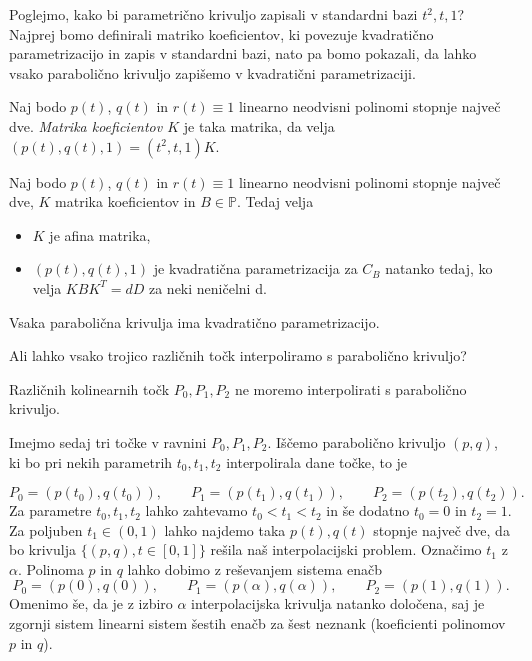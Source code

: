 \documentclass[mat1]{fmfdelo}
\newcommand{\PP}{\mathbb P}
\newcommand{\al}{\alpha}
\begin{document}
Poglejmo, kako bi parametrično krivuljo zapisali v standardni bazi $t^2, t, 1$? Najprej bomo definirali matriko koeficientov, ki povezuje kvadratično parametrizacijo in zapis v standardni bazi, nato pa bomo pokazali, da lahko vsako parabolično krivuljo zapišemo v kvadratični parametrizaciji.

\begin{definicija}
Naj bodo $p(t)$, $q(t)$ in $r(t) \equiv 1$ linearno neodvisni polinomi stopnje največ dve. \emph{Matrika koeficientov $K$} je taka matrika, da velja $ (p(t), q(t), 1) = (t^2,t,1) K$.
\end{definicija} 

\begin{trditev}
Naj bodo $p(t)$, $q(t)$ in $r(t) \equiv 1$ linearno neodvisni polinomi stopnje največ dve, $K$ matrika koeficientov in $B \in \PP$. Tedaj velja
\begin{itemize}
\item $K$ je afina matrika,
\item  $ ( p(t), q(t), 1)$ je kvadratična parametrizacija za $C_B$ natanko tedaj, ko velja $K B K^T = d D$ za neki neničelni d.
\end{itemize}
\end{trditev}


\begin{posledica}
Vsaka parabolična krivulja ima kvadratično parametrizacijo.
\end{posledica}

Ali lahko vsako trojico različnih točk interpoliramo s parabolično krivuljo? 

\begin{trditev}
Različnih kolinearnih točk $P_0, P_1, P_2$ ne moremo interpolirati s parabolično krivuljo.
\end{trditev}

Imejmo sedaj tri točke v ravnini $P_0, P_1, P_2$. Iščemo parabolično krivuljo $(p, q)$, ki bo pri nekih parametrih $t_0, t_1, t_2$ interpolirala dane točke, to je %

$$ P_0 = (p(t_0), q(t_0)), \qquad P_1 = (p(t_1), q(t_1)), \qquad P_2 = (p(t_2), q(t_2)).$$
Za parametre $t_0, t_1, t_2$ lahko zahtevamo $t_0 < t_1 < t_2$ in še dodatno $t_0 = 0$ in $t_2 = 1$. Za poljuben $t_1 \in (0,1)$  lahko najdemo taka $p(t), q(t)$ stopnje največ dve, da bo krivulja $ \{(p, q), t \in [0,1] \}$ rešila naš interpolacijski problem. Označimo $t_1$ z $\al.$  Polinoma $p$ in $q$  lahko dobimo z reševanjem sistema enačb
\begin{equation}\label{sistem}
P_0 = (p(0), q(0)), \qquad P_1 = (p(\al), q(\al)), \qquad P_2 = (p(1), q(1)).
\end{equation}
Omenimo še, da je z izbiro $\al$ interpolacijska krivulja natanko določena, saj je zgornji sistem linearni sistem šestih enačb za šest neznank (koeficienti polinomov $p$ in $q$).
\end{document}
